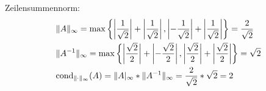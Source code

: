 Zeilensummennorm:
\begin{align*}
\begin{split}
&\|A\|_\infty =\mathrm{max}\left\lbrace\left|\frac{1}{\sqrt2}\right|+\left|\frac{1}{\sqrt2}\right|, \left|-\frac{1}{\sqrt2}\right|+\left|\frac{1}{\sqrt2}\right|\right\rbrace=\frac{2}{\sqrt2}\\
&\|A^{-1}\|_\infty=\mathrm{max}\left\lbrace\left|\frac{\sqrt2}{2}\right|+\left|-\frac{\sqrt2}{2}\right|, \left|\frac{\sqrt2}{2}\right|+\left|\frac{\sqrt2}{2}\right|\right\rbrace={\sqrt2}\\
& \mathrm{cond}_{\| \cdot \|_\infty}(A)=\|A|_\infty*\|A^{-1}\|_\infty=\frac{2}{\sqrt2} * {\sqrt2} = 2\\
\end{split}
\end{align*}
\newline


